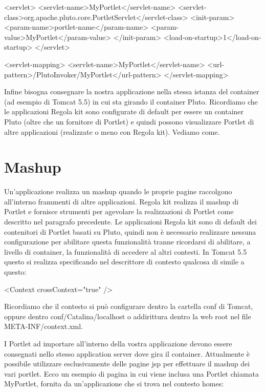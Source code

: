 \begin{xml}
<servlet>
        <servlet-name>MyPortlet</servlet-name>
        <servlet-class>org.apache.pluto.core.PortletServlet</servlet-class>
        <init-param>
            <param-name>portlet-name</param-name>
            <param-value>MyPortlet</param-value>
        </init-param>
        <load-on-startup>1</load-on-startup>
  </servlet>
  
  <servlet-mapping>
      <servlet-name>MyPortlet</servlet-name>
      <url-pattern>/PlutoInvoker/MyPortlet</url-pattern>
  </servlet-mapping>
  
\end{xml}

Infine bisogna consegnare la nostra applicazione nella stessa istanza del container (ad esempio di Tomcat 5.5) in cui sta girando il container Pluto. Ricordiamo che le applicazioni Regola kit sono configurate di default per essere un container Pluto (oltre che un fornitore di Portlet)  e quindi possono visualizzare Portlet di altre applicazioni (realizzate o meno con Regola kit). Vediamo come.

\section{Mashup}
Un'applicazione realizza un mashup quando le proprie pagine raccolgono all'interno frammenti di altre applicazioni. Regola kit realizza il mashup di Portlet e fornisce strumenti per agevolare la realizzazioni di Portlet come descritto nel paragrafo precedente. Le applicazioni Regola kit sono di default dei contenitori di Portlet basati su Pluto, quindi non è necessario realizzare nessuna configurazione per abilitare questa funzionalità tranne ricordarsi di abilitare, a livello di container, la funzionalità di accedere al altri contesti. In Tomcat 5.5 questo si realizza specificando nel descrittore di contesto qualcosa di simile a questo:

\begin{xml}
<Context crossContext="true" />
\end{xml}

Ricordiamo che il contesto si può configurare dentro la cartella conf di Tomcat, oppure dentro conf/Catalina/localhost o addirittura dentro la web root nel file META-INF/context.xml. 

I Portlet ad importare all'interno della vostra applicazione devono essere consegnati nello stesso application server dove gira il container. Attualmente è possibile utilizzare esclusivamente delle pagine jsp per effettuare il mashup dei vari portlet. Ecco un esempio di pagina in cui viene inclusa una Portlet chiamata MyPortlet, fornita da un'applicazione che si trova nel  contesto homes:

